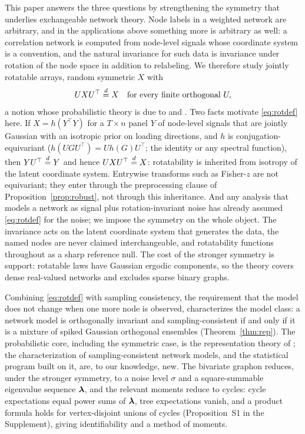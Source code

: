 This paper answers the three questions by strengthening the symmetry
that underlies exchangeable network theory. Node labels in a weighted
network are arbitrary, and in the applications above something more is
arbitrary as well: a correlation network is computed from node-level
signals whose coordinate system is a convention, and the natural
invariance for such data is invariance under rotation of the node space
in addition to relabeling. We therefore study jointly rotatable arrays,
random symmetric $X$ with
\begin{equation}\label{eq:rotdef}
U X U^{\top} \overset{d}{=} X \quad\text{for every finite orthogonal } U,
\end{equation}
a notion whose probabilistic theory is due to
\citet{freedman1962invariants,dawid1977,aldous1981representations} and
\citet{kallenberg1995multivariate,kallenberg2005probabilistic}. Two facts motivate \eqref{eq:rotdef} here. If $X = h(Y^{\top}Y)$ for a
$T\times n$ panel $Y$ of node-level signals that are jointly Gaussian
with an isotropic prior on loading directions, and $h$ is
conjugation-equivariant ($h(UGU^\top)=Uh(G)U^\top$; the identity or
any spectral function), then $YU^{\top}\overset{d}{=} Y$ and hence
$UXU^{\top}\overset{d}{=} X$: rotatability is inherited from isotropy of the
latent coordinate system. Entrywise transforms such as Fisher-$z$ are
not equivariant; they enter through the preprocessing clause of
Proposition~\ref{prop:robust}, not through this inheritance. And any analysis that models a network as signal plus
rotation-invariant noise has already assumed \eqref{eq:rotdef} for the
noise; we impose the symmetry on the whole object. The invariance acts
on the latent coordinate system that generates the data, the named
nodes are never claimed interchangeable, and rotatability functions
throughout as a sharp reference null. The cost of the stronger
symmetry is support: rotatable laws have Gaussian ergodic components, so
the theory covers dense real-valued networks and excludes sparse binary
graphs.

Combining \eqref{eq:rotdef} with sampling consistency, the requirement
that the model does not change when one more node is observed,
characterizes the model class: a network model is orthogonally
invariant and sampling-consistent if and only if it is a mixture of
spiked Gaussian orthogonal ensembles (Theorem~\ref{thm:rep}). The probabilistic core, including the symmetric case, is the
representation theory of
\citet{kallenberg1988some,kallenberg1995multivariate,kallenberg2005probabilistic};
the characterization of sampling-consistent network models, and the
statistical program built on it, are, to our knowledge, new. The bivariate graphon reduces, under the stronger symmetry, to a
noise level $\sigma$ and a square-summable eigenvalue sequence
$\bm{\lambda}$, and the relevant moments reduce to cycles: cycle expectations
equal power sums of $\bm{\lambda}$, tree expectations vanish, and a product formula holds for vertex-disjoint unions of
cycles (Proposition~S1 in the Supplement), giving identifiability and a
method of moments.

